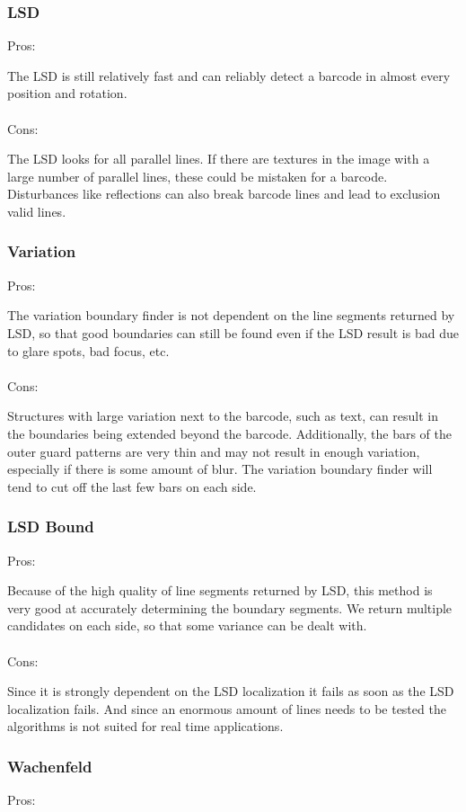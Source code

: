 \subsubsection*{LSD}
Pros:

The LSD is still relatively fast and can reliably detect a barcode in almost every position and rotation.
\\
\\
Cons:

The LSD looks for all parallel lines. If there are textures in the image with a
large number of parallel lines, these could be mistaken for a barcode. Disturbances like reflections can also break barcode lines and lead to exclusion valid lines.

\subsubsection*{Variation}
Pros:

The variation boundary finder is not dependent on the line segments returned by
LSD, so that good boundaries can still be found even if the LSD result is bad
due to glare spots, bad focus, etc. 
\\
\\
Cons:

Structures with large variation next to the barcode, such as text, can result in the boundaries
being extended beyond the barcode. Additionally, the bars of the outer guard
patterns are very thin and may not result in enough variation, especially if
there is some amount of blur. The variation boundary finder will tend to cut off
the last few bars on each side.

\subsubsection*{LSD Bound}
Pros:

Because of the high quality of line segments returned by LSD, this method is
very good at accurately determining the boundary segments. We return
multiple candidates on each side, so that some variance can be dealt with.
\\
\\
Cons:

Since it is strongly dependent on the LSD localization it fails as soon as the LSD localization fails. And since an enormous amount of lines needs to be tested the algorithms is not suited for real time applications.

\subsubsection*{Wachenfeld}
Pros:

